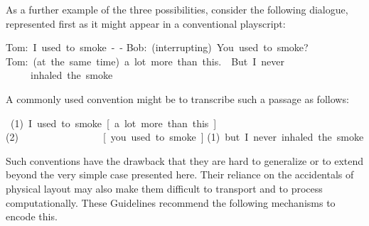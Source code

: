 As a further example of the three possibilities, consider the following dialogue, represented first as it might appear in a conventional playscript: \par\bgroup\exampleFont \begin{shaded}\noindent\mbox{}Tom: I used to smoke - -\newline
Bob: (interrupting) You used to smoke?\newline
Tom: (at the same time) a lot more than this.  But I never\newline
     inhaled the smoke\end{shaded}\egroup\par \noindent   A commonly used convention might be to transcribe such a passage as follows: \par\bgroup\exampleFont \begin{shaded}\noindent\mbox{} (1) I used to smoke [ a lot more than this ]\newline
(2)                 [ you used to smoke ]\newline
(1) but I never inhaled the smoke\end{shaded}\egroup\par \noindent  Such conventions have the drawback that they are hard to generalize or to extend beyond the very simple case presented here. Their reliance on the accidentals of physical layout may also make them difficult to transport and to process computationally. These Guidelines recommend the following mechanisms to encode this.\par
